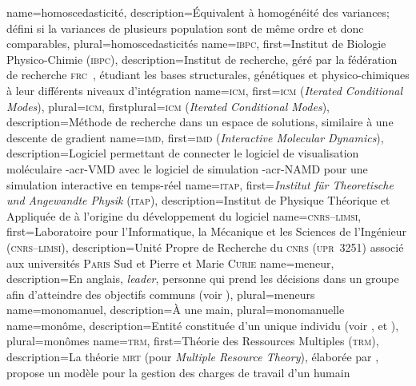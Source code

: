 {%
	name={homoscedasticité},%
	description={Équivalent à homogénéité des variances; défini si la variances de plusieurs population sont de même ordre et donc comparables},
	plural={homoscedasticités}%
}
%
{%
	name={\textsc{ibpc}},%
	first={Institut de Biologie Physico-Chimie (\textsc{ibpc})},%
	description={Institut de recherche, géré par la fédération de recherche \textsc{frc}~, étudiant les bases structurales, génétiques et physico-chimiques à leur différents niveaux d'intégration}%
}
%
{%
	name={\textsc{icm}},
	first={\textsc{icm} (\textit{Iterated Conditional Modes})},%
	plural={\textsc{icm}},
	firstplural={\textsc{icm} (\textit{Iterated Conditional Modes})},%
	description={Méthode de recherche dans un espace de solutions, similaire à une descente de gradient}
}
%
{%
	name={\textsc{imd}},%
	first={\textsc{imd} (\textit{Interactive Molecular Dynamics})},%
	description={Logiciel permettant de connecter le logiciel de visualisation moléculaire \myacro-{acr-VMD} avec le logiciel de simulation \myacro-{acr-NAMD} pour une simulation interactive en temps-réel }%
}
%
{%
	name={\textsc{itap}},%
	first={\textit{Institut für Theoretische und Angewandte Physik} (\textsc{itap})},%
	description={Institut de Physique Théorique et Appliquée de  à l'origine du développement du logiciel }%
}
%
{%
	name={\textsc{cnrs--limsi}},%
	first={Laboratoire pour l'Informatique, la Mécanique et les Sciences de l'Ingénieur (\textsc{cnrs--limsi})},%
	description={Unité Propre de Recherche du \textsc{cnrs} (\textsc{upr}~3251) associé aux universités \textsc{Paris} Sud et Pierre et Marie \textsc{Curie}}%
}
%
{%
	name={meneur},%
	description={En anglais, \textit{leader}, personne qui prend les décisions dans un groupe afin d'atteindre des objectifs communs (voir )},%
	plural={meneurs}%
}
%
{%
	name={monomanuel},%
	description={À une main},%
	plural={monomanuelle}%
}
%
{%
	name={monôme},%
	description={Entité constituée d'un unique individu (voir ,  et )},%
	plural={monômes}%
}
%
{%
	name={\textsc{trm}},
	first={Théorie des Ressources Multiples (\textsc{trm})},%
	description={La théorie \textsc{mrt} (pour \textit{Multiple Resource Theory}), élaborée par , propose un modèle pour la gestion des charges de travail d'un humain}
}
